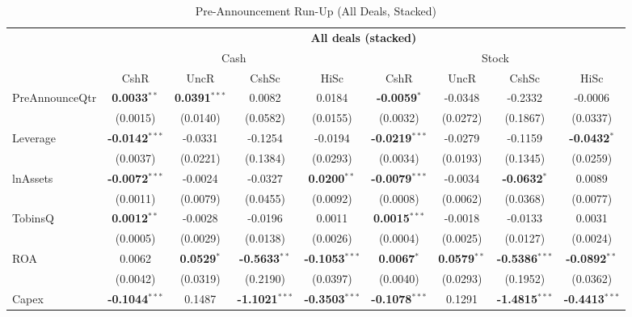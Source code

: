 \begin{landscape}
\begin{table}[htbp]\centering
\caption{Pre-Announcement Run-Up (All Deals, Stacked)}\label{tab:rob_runup}
\scriptsize\begin{adjustbox}{max width=\linewidth}\begin{tabular}{lcccccccc}
\toprule
 & \multicolumn{8}{c}{\textbf{All deals (stacked)}} \\
\cmidrule(lr){2-9}
 & \multicolumn{4}{c}{Cash} & \multicolumn{4}{c}{Stock} \\
\cmidrule(lr){2-5}\cmidrule(lr){6-9}
 & CshR & UncR & CshSc & HiSc & CshR & UncR & CshSc & HiSc \\
\midrule
PreAnnounceQtr & \textbf{0.0033}$^{**}$ & \textbf{0.0391}$^{***}$ & 0.0082 & 0.0184 & \textbf{-0.0059}$^{*}$ & -0.0348 & -0.2332 & -0.0006  \\
 & (0.0015) & (0.0140) & (0.0582) & (0.0155) & (0.0032) & (0.0272) & (0.1867) & (0.0337)  \\
\midrule
Leverage & \textbf{-0.0142}$^{***}$ & -0.0331 & -0.1254 & -0.0194 & \textbf{-0.0219}$^{***}$ & -0.0279 & -0.1159 & \textbf{-0.0432}$^{*}$  \\
 & (0.0037) & (0.0221) & (0.1384) & (0.0293) & (0.0034) & (0.0193) & (0.1345) & (0.0259)  \\
lnAssets & \textbf{-0.0072}$^{***}$ & -0.0024 & -0.0327 & \textbf{0.0200}$^{**}$ & \textbf{-0.0079}$^{***}$ & -0.0034 & \textbf{-0.0632}$^{*}$ & 0.0089  \\
 & (0.0011) & (0.0079) & (0.0455) & (0.0092) & (0.0008) & (0.0062) & (0.0368) & (0.0077)  \\
TobinsQ & \textbf{0.0012}$^{**}$ & -0.0028 & -0.0196 & 0.0011 & \textbf{0.0015}$^{***}$ & -0.0018 & -0.0133 & 0.0031  \\
 & (0.0005) & (0.0029) & (0.0138) & (0.0026) & (0.0004) & (0.0025) & (0.0127) & (0.0024)  \\
ROA & 0.0062 & \textbf{0.0529}$^{*}$ & \textbf{-0.5633}$^{**}$ & \textbf{-0.1053}$^{***}$ & \textbf{0.0067}$^{*}$ & \textbf{0.0579}$^{**}$ & \textbf{-0.5386}$^{***}$ & \textbf{-0.0892}$^{**}$  \\
 & (0.0042) & (0.0319) & (0.2190) & (0.0397) & (0.0040) & (0.0293) & (0.1952) & (0.0362)  \\
Capex & \textbf{-0.1044}$^{***}$ & 0.1487 & \textbf{-1.1021}$^{***}$ & \textbf{-0.3503}$^{***}$ & \textbf{-0.1078}$^{***}$ & 0.1291 & \textbf{-1.4815}$^{***}$ & \textbf{-0.4413}$^{***}$  \\

\end{tabular}
\end{adjustbox}
\end{table}
\end{landscape}
